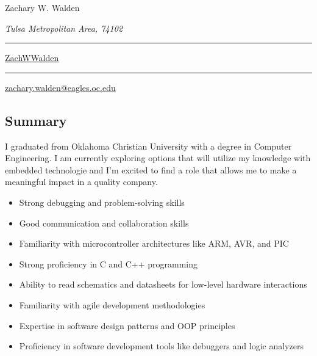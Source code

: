\documentclass{article}
\newcommand\mybar{\kern1pt\rule[-\dp\strutbox]{.8pt}{\baselineskip}\kern1pt}
\begin{document}
\begin{center}
	\begin{Huge}
		Zachary W. Walden\\
	\end{Huge}
	\begin{large}
		\textsl{Tulsa Metropolitan Area, 74102}\\
	\end{large}
	\begin{normalsize}
		 \mybar { } \faGithub \href{https://github.com/ZachWWalden}{ ZachWWalden}
		\mybar { }\faEnvelope\href{mailto::zachary.walden@eagles.oc.edu}{ zachary.walden@eagles.oc.edu}
	\end{normalsize}
\end{center}
\begin{spacing}{.5}
\begin{comment}
\begin{adjustwidth}{30pt}{30pt}
	\textit{\large{---Seeking a challenging position designing and testing software and hardware for mixed-signal embedded systems in a team environment with growth and leadership potential. Utilizing my skills, knowledge and experience to provide excellence in product development and manufacturing.
	Contributing quickly to the success of projects that will improve and expand upon Halliburton's downhole and surface systems.}} %
\end{adjustwidth}
\end{comment}
	\section{Summary}
	\large{I graduated from Oklahoma Christian University with a degree in Computer Engineering. I am currently exploring options that will utilize my knowledge with embedded technologie and I'm excited to find a role that allows me to make a meaningful impact in a quality company.}
\begin{multicols}{2}
		\begin{itemize}[label=$\bullet$,itemsep=-.35ex]
			\item \large{Strong debugging and problem-solving skills}
			\item \large{Good communication and collaboration skills}
			\item \large{Familiarity with microcontroller architectures like ARM, AVR, and PIC}
			\item \large{Strong proficiency in C and C++ programming}
			\item \large{Ability to read schematics and datasheets for low-level hardware interactions}
			\item \large{Familiarity with agile development methodologies}
			\item \large{Expertise in software design patterns and OOP principles}
			\item \large{Proficiency in software development tools like debuggers and logic analyzers}
		\end{itemize}
\end{multicols}

\end{spacing}
\end{document}
